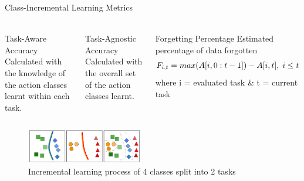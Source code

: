 \documentclass[aspectratio=169, xcolor=dvipsnames]{beamer}
\begin{document}
\begin{frame}{Class-Incremental Learning Metrics}
      \framesubtitle{}%
      
      \vspace{-0.35cm}
      \begin{columns}
      \begin{block}{Task-Aware Accuracy}
            \small Calculated with the knowledge of the action classes learnt within each task.
      \end{block}
      \begin{block}{Task-Agnostic Accuracy}
            \small Calculated with the overall set of the action classes learnt.
      \end{block}
      
      \begin{block}{Forgetting Percentage}
            \small Estimated percentage of data forgotten
            \begin{equation}
            \centering
            F_{i, t} = max(A[i, 0:t-1]) - A[i, t], \; i\leq t
            \end{equation}
            where i = evaluated task \& t = current task
      \end{block}
      
      \end{columns}
      \vfill
      \begin{figure}[ht!]
            \centering
            \includegraphics[width=0.45\textwidth]{images/IL_tasks}
            \caption{Incremental learning process of 4 classes split into 2 tasks\footnotemark}
      \end{figure} 
\end{frame}
\end{document}
